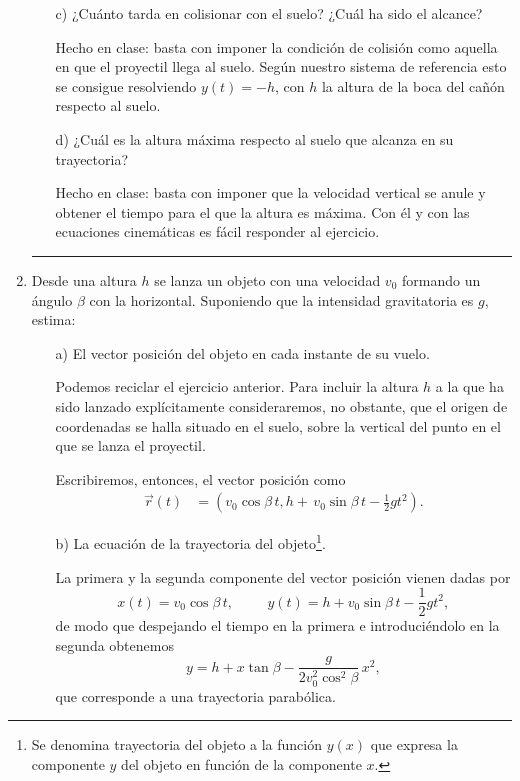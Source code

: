 \documentclass[a4paper,14pt]{extarticle}
\newcommand{\halmos}{
\vspace*{-4ex}

\begin{flushright}
\rule{1mm}{2.5mm} \end{flushright}
\vspace*{-3.5ex}

}
\renewcommand{\qed}{\halmos}
\begin{document}
\begin{enumerate}
\begin{itemize}
    		\item[c)] ¿Cuánto tarda en colisionar con el suelo? ¿Cuál ha sido el alcance?
    		\begin{mdframed}[backgroundcolor=yellow!20]  
    		Hecho en clase: basta con imponer la condición de colisión como aquella en que el proyectil llega al suelo. Según nuestro sistema de referencia esto se consigue resolviendo $y(t)=-h$, con $h$ la altura de la boca del cañón respecto al suelo.
    		\end{mdframed}
    		
    		
    		\item[d)] ¿Cuál es la altura máxima respecto al suelo que alcanza en su trayectoria?
    		\begin{mdframed}[backgroundcolor=yellow!20]  
    		Hecho en clase: basta con imponer que la velocidad vertical se anule y obtener el tiempo para el que la altura es máxima. Con él y con las ecuaciones cinemáticas es fácil responder al ejercicio.
    		\end{mdframed}
    	\end{itemize}
    \qed
    
    \newpage
    
    \item Desde una altura $h$ se lanza un objeto con una velocidad $v_0$ formando un ángulo $\beta$ con la horizontal. Suponiendo que la intensidad gravitatoria es $g$, estima:
    	\begin{itemize}
    		\item[a)] El vector posición del objeto en cada instante de su vuelo.
    		\begin{mdframed}[backgroundcolor=yellow!20]  
    		Podemos reciclar el ejercicio anterior. Para incluir la altura $h$ a la que ha sido lanzado explícitamente consideraremos, no obstante, que el origen de coordenadas se halla situado en el suelo, sobre la vertical del punto en el que se lanza el proyectil.
    		
    		Escribiremos, entonces, el vector posición como
    		\begin{align*}
    		\vec{r}(t)&=\left(v_0\cos\beta\,t,h+\,v_0\sin\beta\,t-\frac{1}{2}gt^2\right).
    		\end{align*}
    		\end{mdframed}
    		\item[b)] La ecuación de la trayectoria del objeto\footnote{Se denomina trayectoria del objeto a la función $y(x)$ que expresa la componente $y$ del objeto en función de la componente $x$.}.
    		\begin{mdframed}[backgroundcolor=yellow!20]  
    		La primera y la segunda componente del vector posición vienen dadas por
    		\[x(t)=v_0\cos\beta\,t,\hspace{1cm}y(t)=h+v_0\sin\beta\,t-\frac{1}{2}gt^2,\]
    		de modo que despejando el tiempo en la primera e introduciéndolo en la segunda obtenemos
    		\[y=h+x\tan\beta-\frac{g}{2v_0^2\cos^2\beta}\,x^2,\]
    		que corresponde a una trayectoria parabólica.
    		\end{mdframed}
    		

\end{itemize}
\end{enumerate}
\end{document}
